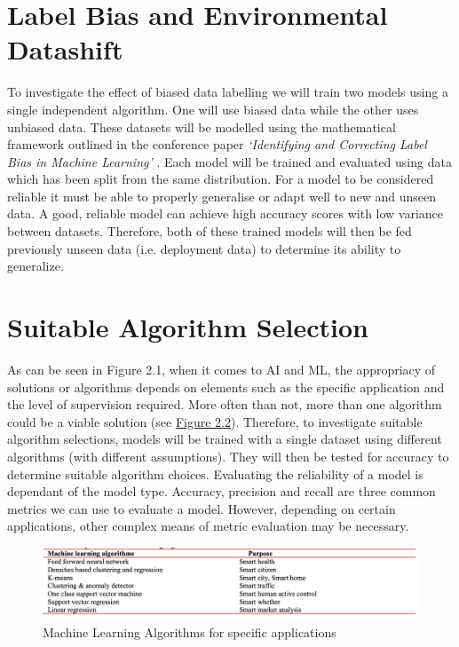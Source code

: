 \documentclass[a4paper,12pt]{report}
\begin{document}
\section{Label Bias and Environmental Datashift}
To investigate the effect of biased data labelling we will train two models using a single independent algorithm. 
One will use biased data while the other uses unbiased data. 
These datasets will be modelled using the mathematical framework outlined in the conference paper \textit{‘Identifying and Correcting Label Bias in Machine Learning’} \cite{Jiang}. 
Each model will be trained and evaluated using data which has been split from the same distribution. 
For a model to be considered reliable it must be able to properly generalise or adapt well to new and unseen data. 
A good, reliable model can achieve high accuracy scores with low variance between datasets. 
Therefore, both of these trained models will then be fed previously unseen data (i.e. deployment data) to determine its ability to generalize.

\section{Suitable Algorithm Selection}
As can be seen in Figure 2.1, when it comes to AI and ML, the appropriacy of solutions or algorithms depends on elements such as the specific application and the level of supervision required. 
More often than not, more than one algorithm could be a viable solution (see \hyperref[fig:algor]{Figure 2.2}). 
Therefore, to investigate suitable algorithm selections, models will be trained with a single dataset using different algorithms (with different assumptions). 
They will then be tested for accuracy to determine suitable algorithm choices. Evaluating the reliability of a model is dependant of the model type. 
Accuracy, precision and recall are three common metrics we can use to evaluate a model. 
However, depending on certain applications, other complex means of metric evaluation may be necessary. 

\begin{figure}[h]
    \centering
    \includegraphics[width=1\textwidth]{ML algorithms.png}
    \caption{Machine Learning Algorithms for specific applications \cite{Mohapatra}}
    \label{fig:applic}
\end{figure}
\end{document}
